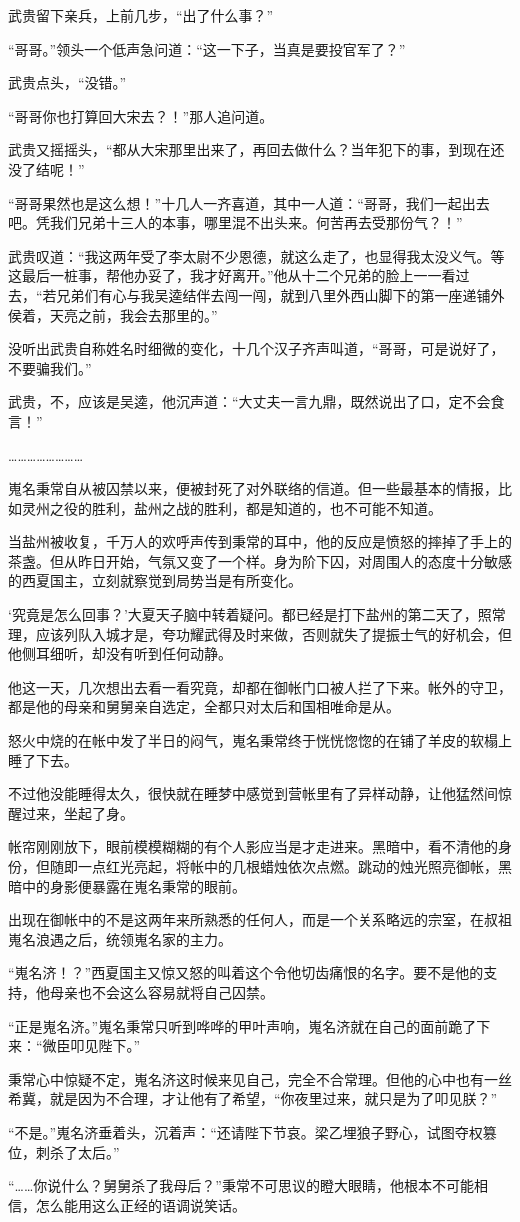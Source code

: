 武贵留下亲兵，上前几步，“出了什么事？”

“哥哥。”领头一个低声急问道：“这一下子，当真是要投官军了？”

武贵点头，“没错。”

“哥哥你也打算回大宋去？！”那人追问道。

武贵又摇摇头，“都从大宋那里出来了，再回去做什么？当年犯下的事，到现在还没了结呢！”

“哥哥果然也是这么想！”十几人一齐喜道，其中一人道：“哥哥，我们一起出去吧。凭我们兄弟十三人的本事，哪里混不出头来。何苦再去受那份气？！”

武贵叹道：“我这两年受了李太尉不少恩德，就这么走了，也显得我太没义气。等这最后一桩事，帮他办妥了，我才好离开。”他从十二个兄弟的脸上一一看过去，“若兄弟们有心与我吴逵结伴去闯一闯，就到八里外西山脚下的第一座递铺外侯着，天亮之前，我会去那里的。”

没听出武贵自称姓名时细微的变化，十几个汉子齐声叫道，“哥哥，可是说好了，不要骗我们。”

武贵，不，应该是吴逵，他沉声道：“大丈夫一言九鼎，既然说出了口，定不会食言！”

……………………

嵬名秉常自从被囚禁以来，便被封死了对外联络的信道。但一些最基本的情报，比如灵州之役的胜利，盐州之战的胜利，都是知道的，也不可能不知道。

当盐州被收复，千万人的欢呼声传到秉常的耳中，他的反应是愤怒的摔掉了手上的茶盏。但从昨日开始，气氛又变了一个样。身为阶下囚，对周围人的态度十分敏感的西夏国主，立刻就察觉到局势当是有所变化。

‘究竟是怎么回事？’大夏天子脑中转着疑问。都已经是打下盐州的第二天了，照常理，应该列队入城才是，夸功耀武得及时来做，否则就失了提振士气的好机会，但他侧耳细听，却没有听到任何动静。

他这一天，几次想出去看一看究竟，却都在御帐门口被人拦了下来。帐外的守卫，都是他的母亲和舅舅亲自选定，全都只对太后和国相唯命是从。

怒火中烧的在帐中发了半日的闷气，嵬名秉常终于恍恍惚惚的在铺了羊皮的软榻上睡了下去。

不过他没能睡得太久，很快就在睡梦中感觉到营帐里有了异样动静，让他猛然间惊醒过来，坐起了身。

帐帘刚刚放下，眼前模模糊糊的有个人影应当是才走进来。黑暗中，看不清他的身份，但随即一点红光亮起，将帐中的几根蜡烛依次点燃。跳动的烛光照亮御帐，黑暗中的身影便暴露在嵬名秉常的眼前。

出现在御帐中的不是这两年来所熟悉的任何人，而是一个关系略远的宗室，在叔祖嵬名浪遇之后，统领嵬名家的主力。

“嵬名济！？”西夏国主又惊又怒的叫着这个令他切齿痛恨的名字。要不是他的支持，他母亲也不会这么容易就将自己囚禁。

“正是嵬名济。”嵬名秉常只听到哗哗的甲叶声响，嵬名济就在自己的面前跪了下来：“微臣叩见陛下。”

秉常心中惊疑不定，嵬名济这时候来见自己，完全不合常理。但他的心中也有一丝希冀，就是因为不合理，才让他有了希望，“你夜里过来，就只是为了叩见朕？”

“不是。”嵬名济垂着头，沉着声：“还请陛下节哀。梁乙埋狼子野心，试图夺权篡位，刺杀了太后。”

“……你说什么？舅舅杀了我母后？”秉常不可思议的瞪大眼睛，他根本不可能相信，怎么能用这么正经的语调说笑话。

